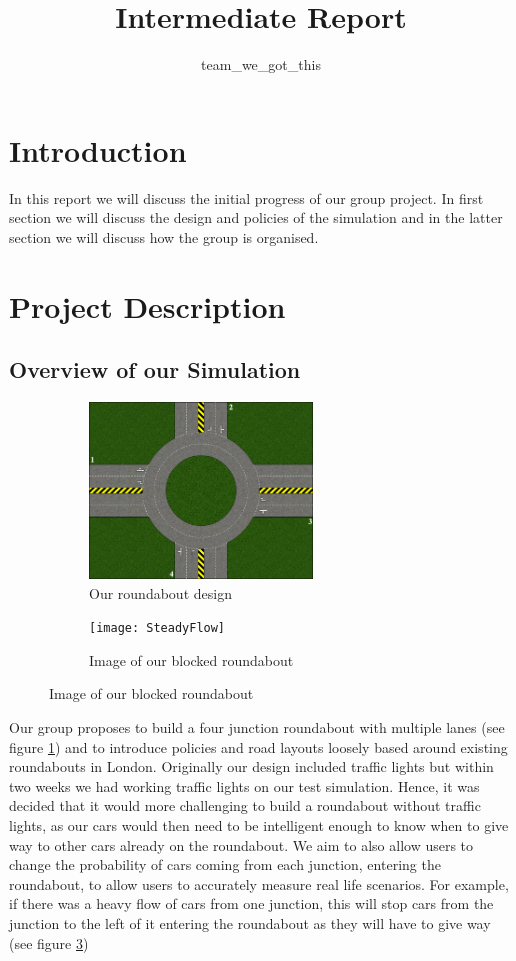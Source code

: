 \documentclass[11pt]{article}
\title{{Intermediate Report}}
\date{}
\author{team\_we\_got\_this}
\begin{document}
	\maketitle
	\thispagestyle{fancy}
	\section{Introduction}
	In this report we will discuss the initial progress of our group project. In first section we will discuss the design and policies of the simulation and in the latter section we will discuss how the group is organised.
	
	
	\section{Project Description}
	
	\subsection{Overview of our Simulation}
	\begin{figure}
		\begin{subfigure}{.45\textwidth}
		\centering
		\includegraphics[width=0.65\textwidth]{Roundabout2}
		\caption{Our roundabout design}
		\label{RoundaboutDesign}
		\end{subfigure}
		\begin{subfigure}{.45\textwidth}
		\centering
		\texttt{[image: SteadyFlow]}
		\caption{Image of our blocked roundabout}
		\label{Steadyflow}
		\end{subfigure}
	\end{figure}
	Our group proposes to build a four junction roundabout with multiple lanes (see figure \ref{RoundaboutDesign}) and to introduce policies and road layouts loosely based around existing roundabouts in London. Originally our design included traffic lights but within two weeks we had working traffic lights on our test simulation. Hence, it was decided that it would more challenging to build a roundabout without traffic lights, as our cars would then need to be intelligent enough to know when to give way to other cars already on the roundabout. We aim to also allow users to change the probability of cars coming from each junction, entering the roundabout, to allow users to accurately measure real life scenarios. For example, if there was a heavy flow of cars from one junction, this will stop cars from the junction to the left of it entering the roundabout as they will have to give way (see figure \ref{Steadyflow})
	
\end{document}
